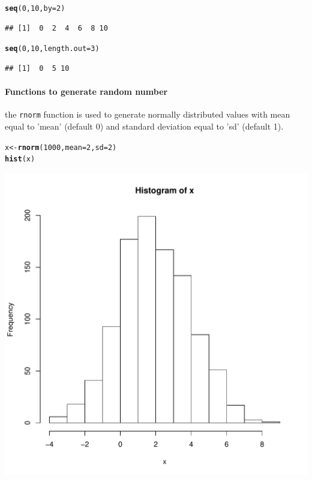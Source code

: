 \documentclass[10pt]{article}\usepackage[]{graphicx}\usepackage[]{color}
\makeatletter
\def\maxwidth{ %
  \ifdim\Gin@nat@width>\linewidth
    \linewidth
  \else
    \Gin@nat@width
  \fi
}
\newcommand{\hlnum}[1]{\textcolor[rgb]{0.686,0.059,0.569}{#1}}%
\newcommand{\hlstd}[1]{\textcolor[rgb]{0.345,0.345,0.345}{#1}}%
\newcommand{\hlkwb}[1]{\textcolor[rgb]{0.69,0.353,0.396}{#1}}%
\newcommand{\hlkwc}[1]{\textcolor[rgb]{0.333,0.667,0.333}{#1}}%
\newcommand{\hlkwd}[1]{\textcolor[rgb]{0.737,0.353,0.396}{\textbf{#1}}}%
\newenvironment{kframe}{%
 \def\at@end@of@kframe{}%
 \ifinner\ifhmode%
  \def\at@end@of@kframe{\end{minipage}}%
  \begin{minipage}{\columnwidth}%
 \fi\fi%
 \def\FrameCommand##1{\hskip\@totalleftmargin \hskip-\fboxsep
 \colorbox{shadecolor}{##1}\hskip-\fboxsep
     \hskip-\linewidth \hskip-\@totalleftmargin \hskip\columnwidth}%
 \MakeFramed {\advance\hsize-\width
   \@totalleftmargin\z@ \linewidth\hsize
   \@setminipage}}%
 {\par\unskip\endMakeFramed%
 \at@end@of@kframe}
\newenvironment{knitrout}{}{} %
\newcommand{\Rfunction}[1]{{\texttt{#1}}}
\makeatother
\begin{document}
\begin{knitrout}
\color{fgcolor}\begin{kframe}
\begin{alltt}
\hlkwd{seq}\hlstd{(}\hlnum{0}\hlstd{,}\hlnum{10}\hlstd{,}\hlkwc{by}\hlstd{=}\hlnum{2}\hlstd{)}
\end{alltt}
\begin{verbatim}
## [1]  0  2  4  6  8 10
\end{verbatim}
\begin{alltt}
\hlkwd{seq}\hlstd{(}\hlnum{0}\hlstd{,}\hlnum{10}\hlstd{,}\hlkwc{length.out}\hlstd{=}\hlnum{3}\hlstd{)}
\end{alltt}
\begin{verbatim}
## [1]  0  5 10
\end{verbatim}
\end{kframe}
\end{knitrout}
\medskip
\paragraph{Functions to generate random number}

the \Rfunction{rnorm} function is used to generate normally distributed values with mean equal to 'mean' (default 0) and standard deviation equal to 'sd' (default 1).
\begin{knitrout}
\color{fgcolor}\begin{kframe}
\begin{alltt}
\hlstd{x} \hlkwb{<-} \hlkwd{rnorm}\hlstd{(}\hlnum{1000}\hlstd{,}\hlkwc{mean}\hlstd{=}\hlnum{2}\hlstd{,}\hlkwc{sd}\hlstd{=}\hlnum{2}\hlstd{)}
\hlkwd{hist}\hlstd{(x)}
\end{alltt}
\end{kframe}
\includegraphics[width=\maxwidth]{figure/unnamed-chunk-17-1} 

\end{knitrout}
\medskip
\end{document}
